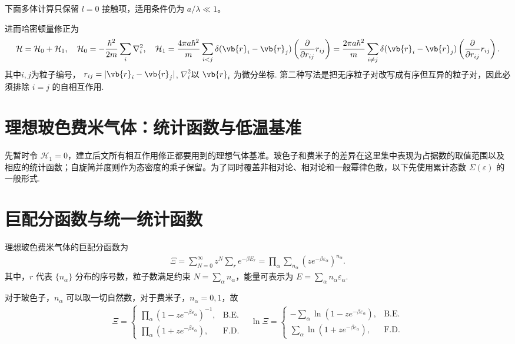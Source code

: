 下面多体计算只保留 \(l=0\) 接触项，适用条件仍为 \(a/\lambda\ll1\)。

进而哈密顿量修正为
\begin{align*}
	\mathcal{H} = \mathcal{H}_{0} + \mathcal{H}_{1}, \quad \mathcal{H}_{0} = -\frac{\hbar^{2}}{2m} \sum_{i} \nabla_{i}^{2}, \quad \mathcal{H}_{1} = \frac{4\pi a \hbar^{2}}{m} \sum_{i<j} \delta(\vb{r}_{i} - \vb{r}_{j}) \left( \frac{\partial}{\partial r_{ij}} r_{ij} \right) = \frac{2\pi a \hbar^{2}}{m} \sum_{i\ne j} \delta(\vb{r}_{i} - \vb{r}_{j}) \left( \frac{\partial}{\partial r_{ij}} r_{ij} \right).
\end{align*}
其中\(i, j\)为粒子编号， \(r_{ij} = |\vb{r}_{i} - \vb{r}_{j}|\), \(\nabla_{i}^{2}\)以 \(\vb{r}_{i}\) 为微分坐标. 第二种写法是把无序粒子对改写成有序但互异的粒子对，因此必须排除 \(i=j\) 的自相互作用.

\section{理想玻色费米气体：统计函数与低温基准}

先暂时令 \(\mathcal{H}_{1}=0\)，建立后文所有相互作用修正都要用到的理想气体基准。玻色子和费米子的差异在这里集中表现为占据数的取值范围以及相应的统计函数；自旋简并度则作为态密度的乘子保留。为了同时覆盖非相对论、相对论和一般幂律色散，以下先使用累计态数 \(\Sigma(\varepsilon)\) 的一般形式.

\section{巨配分函数与统一统计函数}

理想玻色费米气体的巨配分函数为
\begin{align*}
	\Xi = \sum_{N=0}^{\infty} z^{N} \sum_{r} e^{-\beta E_{r}} = \prod_{\alpha} \sum_{n_{\alpha}} \left( z e^{-\beta \varepsilon_{\alpha}} \right)^{n_{\alpha}}.
\end{align*}
其中，\(r\) 代表 \(\{n_{\alpha}\}\) 分布的序号数，粒子数满足约束 \(N = \sum_{\alpha} n_{\alpha}\)，能量可表示为 \(E = \sum_{\alpha} n_{\alpha} \varepsilon_{\alpha}\).

对于玻色子，\(n_{\alpha}\) 可以取一切自然数，对于费米子，\(n_{\alpha} = 0, 1\)，故
\begin{align*}
	\Xi =
	\begin{cases}
		\prod_{\alpha} \left( 1 - z e^{-\beta \varepsilon_{\alpha}} \right)^{-1}, & \text{B.E.} \\
		\prod_{\alpha} \left( 1 + z e^{-\beta \varepsilon_{\alpha}} \right),      & \text{F.D.}
	\end{cases}
	\quad
	\ln \Xi =
	\begin{cases}
		-\sum_{\alpha} \ln \left( 1 - z e^{-\beta \varepsilon_{\alpha}} \right), & \text{B.E.} \\
		\sum_{\alpha} \ln \left( 1 + z e^{-\beta \varepsilon_{\alpha}} \right),  & \text{F.D.}
	\end{cases}
\end{align*}

